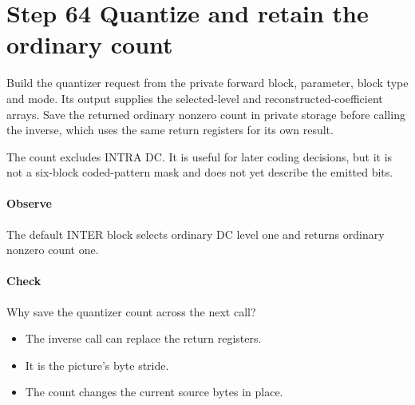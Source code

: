 \section{Step 64 Quantize and retain the ordinary count}\label{h263-block-s04}
Build the quantizer request from the private forward block, parameter, block type
and mode. Its output supplies the selected-level and reconstructed-coefficient
arrays. Save the returned ordinary nonzero count in private storage before
calling the inverse, which uses the same return registers for its own result.

The count excludes INTRA DC. It is useful for later coding decisions, but it
is not a six-block coded-pattern mask and does not yet describe the emitted bits.

\paragraph{Observe} The default INTER block selects ordinary DC level one and
returns ordinary nonzero count one.
\paragraph{Check} Why save the quantizer count across the next call?
\begin{itemize}
  \item[A.] The inverse call can replace the return registers.
  \item[B.] It is the picture's byte stride.
  \item[C.] The count changes the current source bytes in place.
\end{itemize}
